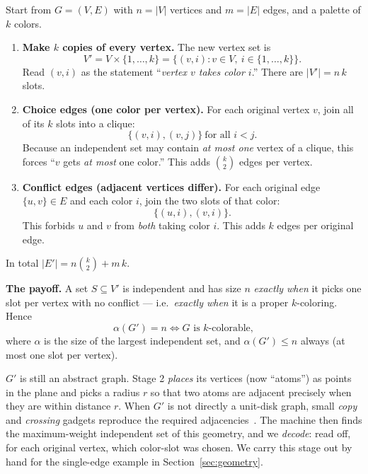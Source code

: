 \documentclass[11pt]{article}
\begin{document}
\begin{tcolorbox}[colback=blue!4,colframe=blue!55!black,title=\textbf{Stage 1
  --- the color-choice graph $G'$ (exact, the heart of everything)},breakable]
Start from $G=(V,E)$ with $n=|V|$ vertices and $m=|E|$ edges, and a palette of
$k$ colors.
\begin{enumerate}[leftmargin=1.6em,itemsep=2pt]
  \item \textbf{Make $k$ copies of every vertex.} The new vertex set is
        \[ V' = V\times\{1,\dots,k\} = \{(v,i) : v\in V,\ i\in\{1,\dots,k\}\}. \]
        Read $(v,i)$ as the statement ``\emph{vertex $v$ takes color $i$}.''
        There are $|V'| = n\,k$ slots.
  \item \textbf{Choice edges (one color per vertex).} For each original vertex
        $v$, join all of its $k$ slots into a clique:
        \[ \{(v,i),(v,j)\}\ \text{for all } i<j. \]
        Because an independent set may contain \emph{at most one} vertex of a
        clique, this forces ``$v$ gets \emph{at most} one color.'' This adds
        $\binom{k}{2}$ edges per vertex.
  \item \textbf{Conflict edges (adjacent vertices differ).} For each original
        edge $\{u,v\}\in E$ and each color $i$, join the two slots of that color:
        \[ \{(u,i),(v,i)\}. \]
        This forbids $u$ and $v$ from \emph{both} taking color $i$. This adds
        $k$ edges per original edge.
\end{enumerate}
In total $|E'| = n\binom{k}{2} + m\,k$.

\medskip
\textbf{The payoff.} A set $S\subseteq V'$ is independent and has size $n$
\emph{exactly when} it picks one slot per vertex with no conflict --- i.e.\
\emph{exactly when} it is a proper $k$-coloring. Hence
\[
   \boxed{\ \alpha(G') = n \iff G \text{ is } k\text{-colorable},\ }
\]
where $\alpha$ is the size of the largest independent set, and $\alpha(G')\le n$
always (at most one slot per vertex).
\end{tcolorbox}

\begin{tcolorbox}[colback=green!4,colframe=green!45!black,title=\textbf{Stage 2
  --- realize $G'$ as a unit-disk graph the machine can run}]
$G'$ is still an abstract graph. Stage 2 \emph{places} its vertices (now ``atoms'')
as points in the plane and picks a radius $r$ so that two atoms are adjacent
precisely when they are within distance $r$. When $G'$ is not directly a unit-disk
graph, small \emph{copy} and \emph{crossing} gadgets reproduce the required
adjacencies~\cite{Pichler2018,Nguyen2023}. The machine then finds the
maximum-weight independent set of this geometry, and we \emph{decode}: read off,
for each original vertex, which color-slot was chosen. We carry this stage out by
hand for the single-edge example in Section~\ref{sec:geometry}.
\end{tcolorbox}
\end{document}

